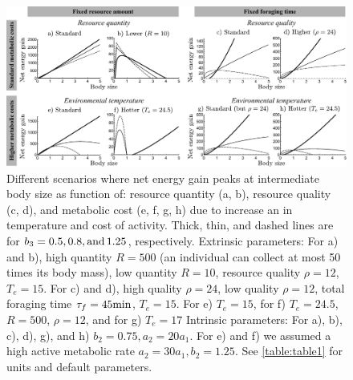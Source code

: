 \begin{figure}[H]
\begin{center}
\includegraphics[width=\textwidth]{fig2}
\caption{
    \setstretch{\stretchby}
	Different scenarios where net energy gain peaks at intermediate body size as function of: resource quantity (a, b), resource quality (c, d), and metabolic cost (e, f, g, h) due to increase an in temperature and cost of activity.
	Thick, thin, and dashed lines are for $b_3 = 0.5, 0.8, \rm{ and }\, 1.25$, respectively.
	Extrinsic parameters:
	For a) and b), high quantity $R = 500$ (an individual can collect at most 50 times its body mass), low quantity $R= 10$, resource quality $\rho = 12$, $T_e = 15$.
	For c) and d), high quality $\rho = 24$, low quality $\rho = 12$, total foraging time $\tau_f = 45 \rm{min}$, $T_e = 15$.
	For e) $T_e = 15$, for f) $T_e = 24.5$, $R = 500$, $\rho = 12$, and for g) $T_e = 17$
	Intrinsic parameters:
	For a), b), c), d), g), and h) $b_2 = 0.75, a_2 = 20 a_1$.
	For e) and f) we assumed a high active metabolic rate $a_2 = 30 a_1, b_2  = 1.25$.
	See \cref{table:table1} for units and default parameters.
}
\label{fig2}
\end{center}
\end{figure}

